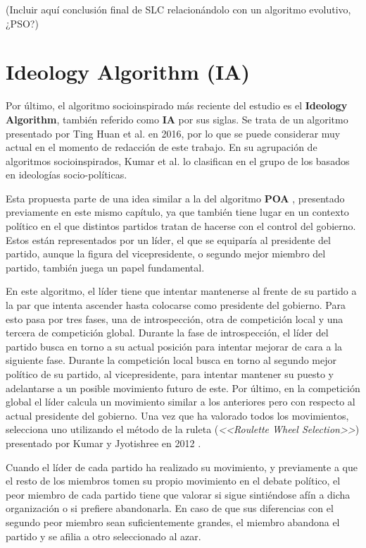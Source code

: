 (Incluir aquí conclusión final de SLC relacionándolo con un algoritmo evolutivo, ¿PSO?)

\section{Ideology Algorithm (IA)}

Por último, el algoritmo socioinspirado más reciente del estudio es el \textbf{Ideology Algorithm}, también referido como \textbf{IA} por sus siglas. Se trata de un algoritmo presentado por Ting Huan et al. \cite{ia-article} en 2016, por lo que se puede considerar muy actual en el momento de redacción de este trabajo. En su agrupación de algoritmos socioinspirados, Kumar et al. \cite{socio-evolution-algorithm} lo clasifican en el grupo de los basados en ideologías socio-políticas.

Esta propuesta parte de una idea similar a la del algoritmo \textbf{POA} \cite{poa-article}, presentado previamente en este mismo capítulo, ya que también tiene lugar en un contexto político en el que distintos partidos tratan de hacerse con el control del gobierno. Estos están representados por un líder, el que se equiparía al presidente del partido, aunque la figura del vicepresidente, o segundo mejor miembro del partido, también juega un papel fundamental.

En este algoritmo, el líder tiene que intentar mantenerse al frente de su partido a la par que intenta ascender hasta colocarse como presidente del gobierno. Para esto pasa por tres fases, una de introspección, otra de competición local y una tercera de competición global. Durante la fase de introspección, el líder del partido busca en torno a su actual posición para intentar mejorar de cara a la siguiente fase. Durante la competición local busca en torno al segundo mejor político de su partido, al vicepresidente, para intentar mantener su puesto y adelantarse a un posible movimiento futuro de este. Por último, en la competición global el líder calcula un movimiento similar a los anteriores pero con respecto al actual presidente del gobierno. Una vez que ha valorado todos los movimientos, selecciona uno utilizando el método de la ruleta (\textit{<<Roulette Wheel Selection>>}) presentado por Kumar y Jyotishree en 2012 \cite{roulette-wheel-selection}.

Cuando el líder de cada partido ha realizado su movimiento, y previamente a que el resto de los miembros tomen su propio movimiento en el debate político, el peor miembro de cada partido tiene que valorar si sigue sintiéndose afín a dicha organización o si prefiere abandonarla. En caso de que sus diferencias con el segundo peor miembro sean suficientemente grandes, el miembro abandona el partido y se afilia a otro seleccionado al azar.

